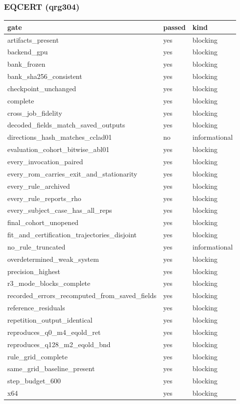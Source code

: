 \documentclass[11pt]{article}
\begin{document}
\subsubsection{EQCERT (qrg304)}
\begin{table}[htbp]\centering\small
\begin{tabular}{lll}\hline
gate & passed & kind \\ \hline
artifacts\_present & yes & blocking \\
backend\_gpu & yes & blocking \\
bank\_frozen & yes & blocking \\
bank\_sha256\_consistent & yes & blocking \\
checkpoint\_unchanged & yes & blocking \\
complete & yes & blocking \\
cross\_job\_fidelity & yes & blocking \\
decoded\_fields\_match\_saved\_outputs & yes & blocking \\
directions\_hash\_matches\_cclad01 & no & informational \\
evaluation\_cohort\_bitwise\_abl01 & yes & blocking \\
every\_invocation\_paired & yes & blocking \\
every\_rom\_carries\_exit\_and\_stationarity & yes & blocking \\
every\_rule\_archived & yes & blocking \\
every\_rule\_reports\_rho & yes & blocking \\
every\_subject\_case\_has\_all\_reps & yes & blocking \\
final\_cohort\_unopened & yes & blocking \\
fit\_and\_certification\_trajectories\_disjoint & yes & blocking \\
no\_rule\_truncated & yes & informational \\
overdetermined\_weak\_system & yes & blocking \\
precision\_highest & yes & blocking \\
r3\_mode\_blocks\_complete & yes & blocking \\
recorded\_errors\_recomputed\_from\_saved\_fields & yes & blocking \\
reference\_residuals & yes & blocking \\
repetition\_output\_identical & yes & blocking \\
reproduces\_q0\_m4\_eqold\_ret & yes & blocking \\
reproduces\_q128\_m2\_eqold\_bnd & yes & blocking \\
rule\_grid\_complete & yes & blocking \\
same\_grid\_baseline\_present & yes & blocking \\
step\_budget\_600 & yes & blocking \\
x64 & yes & blocking \\
\hline\end{tabular}
\end{table}
\end{document}
